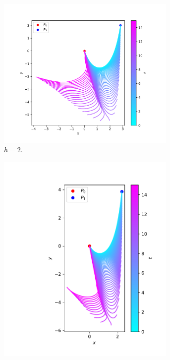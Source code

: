 \documentclass[a4paper, 12pt, slovene]{article}
\numberwithin{equation}{section}
\begin{document}
\begin{figure}[H]\ContinuedFloat
\begin{subfigure}{0.575\textwidth}
	\centering
	\includegraphics[width=0.95\textwidth]{grafi/falling_chain_P.3.0-2.0_L.6_n.50_t.15_r.0.0005_m.0.2_g.1_dt.0.01_freq.25.pdf}
	\caption{$h = 2$.}
	\label{f:ver-2}
\end{subfigure}
\begin{subfigure}{0.415\textwidth}
	\centering
	\includegraphics[width=0.95\textwidth]{grafi/falling_chain_P.3.0-4.0_L.6_n.60_t.15_r.0.0005_m.0.2_g.1_dt.0.01_freq.25.pdf}

\end{subfigure}
\end{figure}
\end{document}

